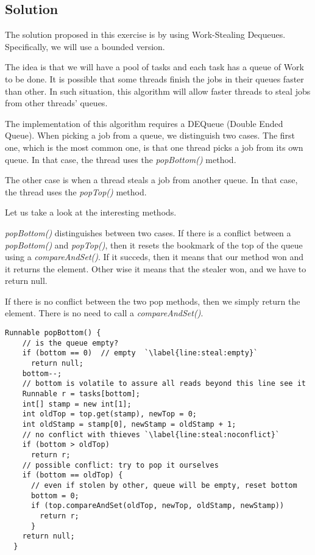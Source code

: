 \subsection{Solution}
\par
The solution proposed in this exercise is by using Work-Stealing Dequeues.
Specifically, we will use a bounded version.
\par
The idea is that we will have a pool of tasks and each task has a queue of Work
to be done. It is possible that some threads finish the jobs in their queues
faster than other. In such situation, this algorithm will allow faster threads
to steal jobs from other threads' queues. 
\par
The implementation of this algorithm requires a DEQueue (Double Ended Queue).
When picking a job from a queue, we distinguish two cases. The first one, which
is the most common one, is that one thread picks a job from its own queue. In
that case, the thread uses the \textit{popBottom()} method.
\par
The other case is when a thread steals a job from another queue. In that case,
the thread uses the \textit{popTop()} method.
\par
Let us take a look at the interesting methods.
\par
\textit{popBottom()} distinguishes between two cases. If there is a conflict
between a \textit{popBottom()} and \textit{popTop()}, then it resets the
bookmark of the top of the queue using a \textit{compareAndSet()}. If it
succeds, then it means that our method won and it returns the element. Other
wise it means that the stealer won, and we have to return null.
\par
If there is no conflict between the two pop methods, then we simply return the
element. There is no need to call a \textit{compareAndSet()}.
\par
\hfill
\begin{lstlisting}[style=numbers]
  Runnable popBottom() {
    // is the queue empty?
    if (bottom == 0)  // empty  `\label{line:steal:empty}`
      return null;
    bottom--;
    // bottom is volatile to assure all reads beyond this line see it
    Runnable r = tasks[bottom];
    int[] stamp = new int[1];
    int oldTop = top.get(stamp), newTop = 0;
    int oldStamp = stamp[0], newStamp = oldStamp + 1;
    // no conflict with thieves `\label{line:steal:noconflict}`
    if (bottom > oldTop)
      return r;
    // possible conflict: try to pop it ourselves
    if (bottom == oldTop) {
      // even if stolen by other, queue will be empty, reset bottom
      bottom = 0;
      if (top.compareAndSet(oldTop, newTop, oldStamp, newStamp))
        return r;
      } 
    return null;
  }
\end{lstlisting}
\hfill
\par
